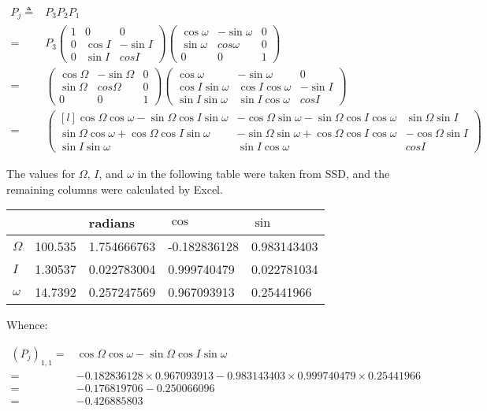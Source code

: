 \documentclass[]{article}
\begin{document}
\begin{align*}
P_j \triangleq& P_3 P_2 P_1\\
 =& P_3 \begin{pmatrix}
1 & 0 & 0\\
0 & \cos I & - \sin I\\
0 & \sin I & cos I
\end{pmatrix}
\begin{pmatrix}
\cos \omega & - \sin \omega & 0\\
\sin \omega & cos \omega & 0\\
0 & 0  & 1
\end{pmatrix} \\
=& \begin{pmatrix}
\cos \Omega & - \sin \Omega & 0\\
\sin \Omega & cos \Omega & 0\\
0 & 0  & 1
\end{pmatrix}
\begin{pmatrix}
\cos \omega & -\sin \omega & 0\\
\cos I \sin \omega & \cos I \cos \omega & - \sin I\\
\sin I \sin \omega & \sin I \cos \omega & cos I
\end{pmatrix}\\
=&\begin{pmatrix*}[l]
\cos \Omega \cos \omega - \sin \Omega \cos I \sin \omega&-\cos \Omega \sin \omega - \sin \Omega \cos I \cos \omega& \sin \Omega \sin I\\
\sin \Omega \cos \omega + \cos \Omega \cos I \sin \omega& - \sin \Omega \sin \omega + \cos \Omega \cos I \cos \omega& - \cos \Omega \sin I \\
\sin I \sin \omega & \sin I \cos \omega & cos I
\end{pmatrix*}
\end{align*}

The values for $\Omega$, $I$, and $\omega$ in the following table were taken from SSD, and the remaining columns were calculated by Excel.
\begin{center}
	\begin{tabular}{|l|l|l|l|l|}
		\hline
		&&	radians&$\cos$&$\sin$\\ \hline
		$\Omega$&100.535\degree	&1.754666763&	-0.182836128&	0.983143403\\ \hline
		$I$&1.30537\degree&	0.022783004&	0.999740479&	0.022781034\\ \hline
		$\omega$&14.7392\degree&	0.257247569&	0.967093913&	0.25441966\\ \hline
	\end{tabular}
\end{center}

Whence:

\begin{align*}
(P_j)_{1,1} =& \cos \Omega \cos \omega - \sin \Omega \cos I \sin \omega \\
=& -0.182836128 \times 	0.967093913 - 0.983143403 \times 0.999740479 \times 	0.25441966\\
=& -0.176819706 - 0.250066096\\
=& -0.426885803
\end{align*}
\end{document}
